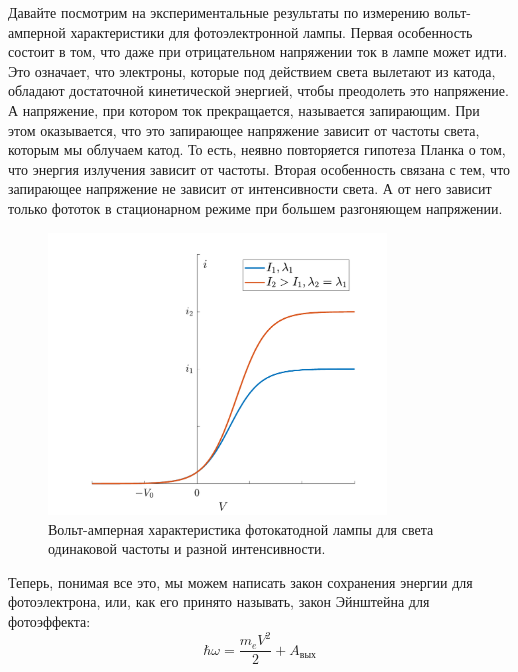 \documentclass[12pt]{article}
\begin{document}
\noindent
Давайте посмотрим на экспериментальные результаты по измерению вольт-амперной характеристики для фотоэлектронной лампы. Первая особенность состоит в том, что даже при отрицательном напряжении ток в лампе может идти. Это означает, что электроны, которые под действием света вылетают из катода, обладают достаточной кинетической энергией, чтобы преодолеть это напряжение. А напряжение, при котором ток прекращается, называется запирающим. При этом оказывается, что это запирающее напряжение зависит от частоты света, которым мы облучаем катод. То есть, неявно повторяется гипотеза Планка о том, что энергия излучения зависит от частоты. Вторая особенность связана с тем, что запирающее напряжение не зависит от интенсивности света. А от него зависит только фототок в стационарном режиме при большем разгоняющем напряжении.
\begin{figure}[h]
    \centering
    \includegraphics[width=0.8\textwidth,keepaspectratio]{Seminar_02/pics/pic_01.pdf}
    \caption{Вольт-амперная характеристика фотокатодной лампы для света одинаковой частоты и разной интенсивности.}
    \label{fig:sem_02_photocatod_VAX}
\end{figure}

\noindent
Теперь, понимая все это, мы можем написать закон сохранения энергии для фотоэлектрона, или, как его принято называть, закон Эйнштейна для фотоэффекта:
\begin{equation}
    \hbar \omega = \dfrac{m_eV^2}{2} + A_{\text{вых}}
\end{equation}
\end{document}
